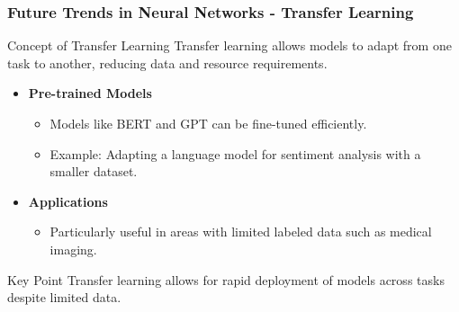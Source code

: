\documentclass[aspectratio=169]{beamer}
\begin{document}
\begin{frame}[fragile]
    \frametitle{Future Trends in Neural Networks - Transfer Learning}
    \begin{block}{Concept of Transfer Learning}
        Transfer learning allows models to adapt from one task to another, reducing data and resource requirements.
        \begin{itemize}
            \item \textbf{Pre-trained Models}
                \begin{itemize}
                    \item Models like BERT and GPT can be fine-tuned efficiently.
                    \item Example: Adapting a language model for sentiment analysis with a smaller dataset.
                \end{itemize}
            \item \textbf{Applications}
                \begin{itemize}
                    \item Particularly useful in areas with limited labeled data such as medical imaging.
                \end{itemize}
        \end{itemize}
    \end{block}
    \begin{block}{Key Point}
        Transfer learning allows for rapid deployment of models across tasks despite limited data.
    \end{block}
\end{frame}
\end{document}
